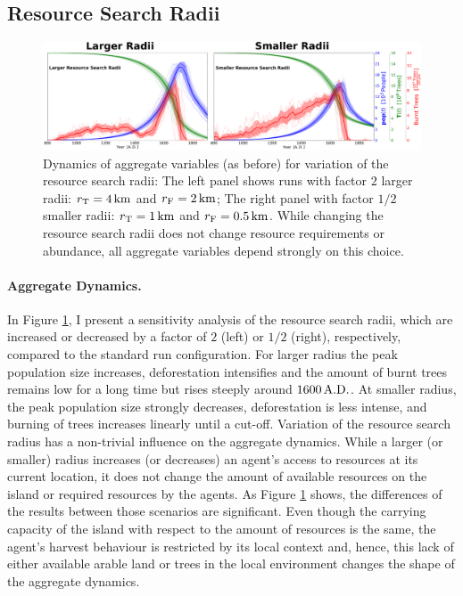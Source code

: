 \subsection{Resource Search Radii}
\begin{figure}
	\centering
	\includegraphics[width=1.3\linewidth, center]{images/Results/EnsembleStatistics_largersmallerRad}
	\caption{Dynamics of aggregate variables (as before) for variation of the resource search radii: The left panel shows runs with factor $2$ larger radii: $r_{\rm T}=4\, {\rm km}$ and $r_{\rm F}=2\, {\rm km}$; The right panel with factor $1/2$ smaller radii: $r_{\rm T}=1\, {\rm km}$ and $r_{\rm F}=0.5\, {\rm km}$. While changing the resource search radii does not change resource requirements or abundance, all aggregate variables depend strongly on this choice.}
	\label{fig:ensemblestatisticslargersmallerrad}
\end{figure}

\paragraph{Aggregate Dynamics.}
In Figure \ref{fig:ensemblestatisticslargersmallerrad}, I present a sensitivity analysis of the resource search radii, which are increased or decreased by a factor of $2$ (left) or  $1/2$ (right), respectively, compared to the standard run configuration. 
For larger radius the peak population size increases, deforestation intensifies and the amount of burnt trees remains low for a long time but rises steeply around $1600\, {\rm A.D.}$.
At smaller radius, the peak population size strongly decreases, deforestation is less intense, and burning of trees increases linearly until a cut-off.
Variation of the resource search radius has a non-trivial influence on the aggregate dynamics.
While a larger (or smaller) radius increases (or decreases) an agent's access to resources at its current location, it does not change the amount of available resources on the island or required resources by the agents.
As Figure \ref{fig:ensemblestatisticslargersmallerrad} shows, the differences of the results between those scenarios are significant. 
Even though the carrying capacity of the island with respect to the amount of resources is the same, the agent's harvest behaviour is restricted by its local context and, hence, this lack of either available arable land or trees in the local environment changes the shape of the aggregate dynamics.

